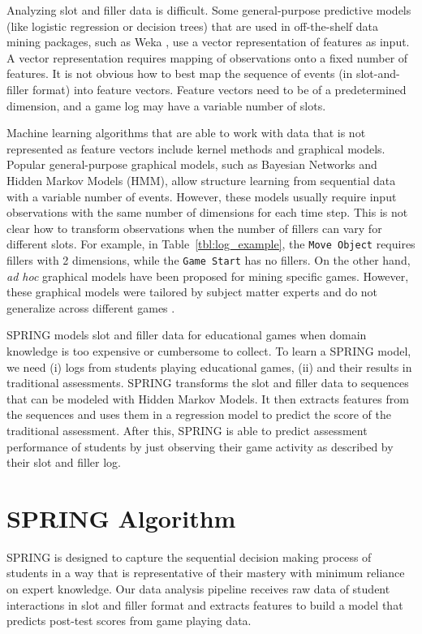 \documentclass{sigchi}
\def\algname{SPRING\xspace}
\begin{document}
	Analyzing slot and filler data is difficult.
	Some general-purpose predictive models (like logistic regression or decision trees)  that are used in off-the-shelf data mining packages, such as Weka \cite{hall2009weka}, use a vector representation of features as input. 
	A vector representation requires mapping of observations onto a fixed number of features.
	It is not obvious how to best map the sequence of events (in slot-and-filler format)  into feature vectors.
	Feature vectors need to be of a predetermined dimension, and a game log may have a variable number of slots.
	
	Machine learning algorithms that are able to work with data that is not represented as feature vectors include kernel methods and graphical models.
	Popular general-purpose graphical models, such as Bayesian Networks and Hidden Markov Models (HMM), allow structure learning from sequential data with a variable number of events.
	However, these models usually require input observations with the same number of dimensions for each time step.
	This is not clear how to transform observations when the number of fillers can vary for different slots.
	For example, in Table~\ref{tbl:log_example}, the \texttt{Move Object} requires fillers with 2 dimensions, while the \texttt{Game Start} has no fillers.
	On the other hand, \textit{ad hoc} graphical models have  been proposed for mining specific games.
	However, these graphical models were tailored by subject matter experts and do not generalize across different games \cite{rowe2010integrating}.
	
	\algname models slot and filler data for educational games when domain knowledge is too expensive or cumbersome to collect.
	To learn a \algname model, we need (i) logs  from students playing educational games, (ii) and  their results in  traditional assessments.
	\algname transforms the slot and filler data to sequences that can be modeled with Hidden Markov Models.
	It then extracts features from the sequences and uses them in a regression model to predict the score of the traditional assessment.
	After this, \algname is able to predict assessment performance of students by just observing their game activity as described by their slot and filler log.
	
	\section{SPRING Algorithm}
	\label{sec:spring}
	
	
	\algname is designed to capture the sequential decision making process of students in a way that is representative of their mastery with minimum reliance on expert knowledge. 
	Our data analysis pipeline receives raw data of student interactions in slot and filler format and extracts features to build a model that predicts post-test scores from game playing data.
\end{document}
